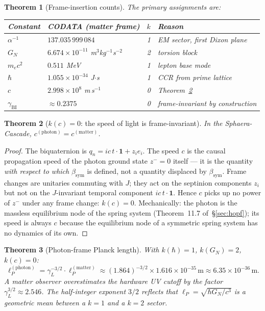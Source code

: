 \documentclass[12pt,a4paper]{article}
\newtheorem{theorem}{Theorem}[section]
\newcommand{\bsym}{\beta_{\mathrm{sym}}}
\newcommand{\gL}{\gamma_L}
\newcommand{\gBI}{\gamma_{\mathrm{BI}}}
\newcommand{\lP}{\ell_P}
\newcommand{\zminus}{z^-}
\begin{document}
\begin{theorem}[Frame-insertion counts]\label{thm:k-values}
The primary assignments are:
\begin{center}
\renewcommand{\arraystretch}{1.3}
\begin{tabular}{llcl}
\toprule
Constant & CODATA (matter frame) & $k$ & Reason\\
\midrule
$\alpha^{-1}$ & $137.035\,999\,084$ & 1
  & EM sector, first Dixon plane\\
$G_N$ & $6.674\times10^{-11}$ m$^3$kg$^{-1}$s$^{-2}$ & 2
  & torsion block\\
$m_e c^2$ & $0.511$ MeV & 1
  & lepton base mode\\
$\hbar$ & $1.055\times10^{-34}$ J$\cdot$s & 1
  & CCR from prime lattice\\
$c$ & $2.998\times10^8$ m\,s$^{-1}$ & 0
  & Theorem~\ref{thm:kc-zero}\\
$\gBI$ & $\approx 0.2375$ & 0
  & frame-invariant by construction\\
\bottomrule
\end{tabular}
\end{center}
\end{theorem}

\begin{theorem}[$k(c)=0$: the speed of light is frame-invariant]
\label{thm:kc-zero}
In the Sphaera-Cascade, $c^{(\mathrm{photon})}=c^{(\mathrm{matter})}$.
\end{theorem}

\begin{proof}
The biquaternion is $q_n = ic\,t\cdot\mathbf{1}+z_i e_i$.
The speed $c$ is the causal propagation speed of the photon ground state
$\zminus=0$ itself --- it is the quantity \emph{with respect to which}
$\bsym$ is defined, not a quantity displaced by $\bsym$.
Frame changes are unitaries commuting with $J$; they act on the septinion
components $z_i$ but not on the $J$-invariant temporal component
$ic\,t\cdot\mathbf{1}$.
Hence $c$ picks up no power of $\zminus$ under any frame change:
$k(c)=0$.
Mechanically: the photon is the massless equilibrium node of the
spring system (Theorem~11.7 of~\S\ref{sec:hopf}); its speed is always $c$ because
the equilibrium node of a symmetric spring system has no dynamics of its own.
\end{proof}

\begin{theorem}[Photon-frame Planck length]\label{thm:planck-photon}
With $k(\hbar)=1$, $k(G_N)=2$, $k(c)=0$:
\[
  \lP^{(\mathrm{photon})}
  = \gL^{-3/2}\cdot\lP^{(\mathrm{matter})}
  \approx (1.864)^{-3/2}\times 1.616\times10^{-35}\,\mathrm{m}
  \approx 6.35\times10^{-36}\,\mathrm{m}.
\]
A matter observer overestimates the hardware UV cutoff by the factor
$\gL^{3/2}\approx 2.546$.
The half-integer exponent $3/2$ reflects that $\lP=\sqrt{\hbar G_N/c^3}$
is a geometric mean between a $k=1$ and a $k=2$ sector.
\end{theorem}
\end{document}
